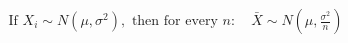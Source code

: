 \documentclass[preview]{standalone}
\begin{document}
\begin{align*}
\text{If } X_i \sim N(\mu,\sigma^2), \text{ then for every } n: \quad \bar{X} \sim N\left(\mu, \frac{\sigma^2}{n}\right)
\end{align*}
\end{document}

